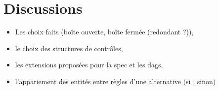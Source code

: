 
\section{Discussions}
\label{sec:reevaluation-scripts-discussions}

\begin{itemize}
  \item Les choix faits (boîte ouverte, boîte fermée (redondant ?)),
  \item le choix des structures de contrôles,
  \item les extensions proposées pour la spec et les dags,
  \item l'appariement des entités entre règles d'une alternative (si | sinon)
\end{itemize}

